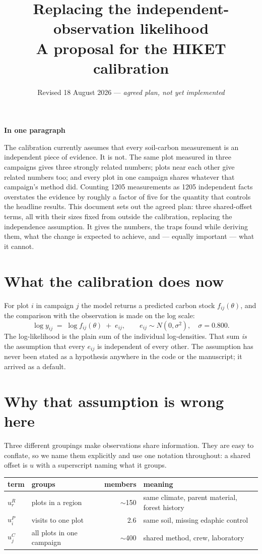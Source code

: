 \documentclass[11pt]{article}
\title{Replacing the independent-observation likelihood\\
\large A proposal for the HIKET calibration}
\author{}
\date{Revised 18 August 2026 --- \emph{agreed plan, not yet implemented}}
\newenvironment{keybox}[1][]{%
  \begin{leftbar}\noindent\textbf{\small #1}\par\vspace{0.3em}\small}{\end{leftbar}}
\begin{document}
\maketitle

\begin{keybox}[In one paragraph]
The calibration currently assumes that every soil-carbon measurement is an
independent piece of evidence. It is not. The same plot measured in three campaigns
gives three strongly related numbers; plots near each other give related numbers
too; and every plot in one campaign shares whatever that campaign's method did.
Counting 1205 measurements as 1205 independent facts overstates the evidence by
roughly a factor of five for the quantity that controls the headline results. This
document sets out the agreed plan: three shared-offset terms, all with their sizes
fixed from outside the calibration, replacing the independence assumption. It gives
the numbers, the traps found while deriving them, what the change is expected to
achieve, and --- equally important --- what it cannot.
\end{keybox}

\section{What the calibration does now}

For plot $i$ in campaign $j$ the model returns a predicted carbon stock
$f_{ij}(\theta)$, and the comparison with the observation is made on the log scale:
\[
\log y_{ij} \;=\; \log f_{ij}(\theta) \;+\; e_{ij},
\qquad e_{ij}\sim N(0,\sigma^2), \quad \sigma = 0.800 .
\]
The log-likelihood is the plain sum of the individual log-densities. That sum
\emph{is} the assumption that every $e_{ij}$ is independent of every other. The
assumption has never been stated as a hypothesis anywhere in the code or the
manuscript; it arrived as a default.

\section{Why that assumption is wrong here}

Three different groupings make observations share information. They are easy to
conflate, so we name them explicitly and use one notation throughout: a shared
offset is $u$ with a superscript naming what it groups.

\begin{center}
\begin{tabular}{llrl}
\toprule
term & groups & members & meaning \\
\midrule
$u^{R}_{r}$ & plots in a region & $\sim$150 & same climate, parent material, forest history \\
$u^{P}_{i}$ & visits to one plot & 2.6 & same soil, missing edaphic control \\
$u^{C}_{j}$ & all plots in one campaign & $\sim$400 & shared method, crew, laboratory \\
\bottomrule
\end{tabular}
\end{center}
\end{document}
